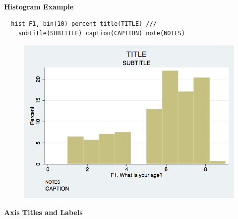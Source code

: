 \documentclass[]{book}
\begin{document}
\textbf{Histogram Example}

\begin{verbatim}
  hist F1, bin(10) percent title(TITLE) ///
    subtitle(SUBTITLE) caption(CAPTION) note(NOTES)
\end{verbatim}

\begin{figure}
\centering
\includegraphics{Stata/StataModGraph/images/hist1.png}
\caption{}
\end{figure}

\textbf{Axis Titles and Labels}
\end{document}
